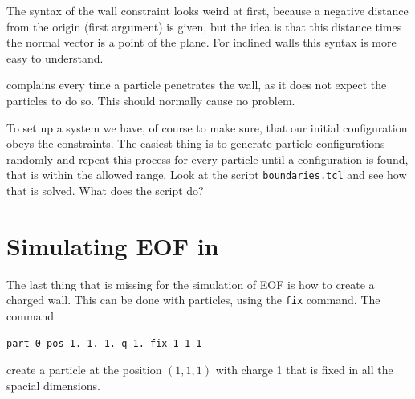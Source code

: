 The syntax of the wall constraint looks weird at first, because a negative
distance from the origin (first argument) is given, but the idea is that
this distance times the normal vector is a point of the plane. For inclined
walls this syntax is more easy to understand.

\ES{} complains every time a particle penetrates the wall, as it does not
expect the particles to do so. This should normally cause no problem. 

To set up a system we have, of course to make sure, that our initial
configuration obeys the constraints. The easiest thing is to 
generate particle configurations randomly and repeat this process
for every particle until a configuration is found, that
is within the allowed range. Look at the script \lstinline|boundaries.tcl|
and see how that is solved. What does the script do?

\section{Simulating EOF in \ES{}}
The last thing that is missing for the simulation of EOF is
how to create a charged wall. This can be done with
particles, using the \lstinline|fix| command. The command
\begin{lstlisting}[numbers=none]
part 0 pos 1. 1. 1. q 1. fix 1 1 1
\end{lstlisting}
create a particle at the position $\left(1,1,1\right)$ with
charge 1 that is fixed in all the spacial dimensions.

